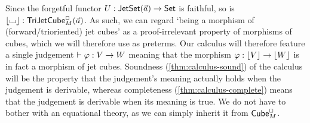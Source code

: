 \documentclass[a4paper]{article}
\begin{document}
Since the forgetful functor $U : \mathsf{JetSet}(\vec a) \to {\mathsf{Set}}$ is faithful, so is $\mathopen{}\left\lfloor {\llcorner\hspace{-.4ex}\lrcorner} \right\rfloor\mathclose{} : \mathsf{TriJetCube}^{\Box}_{M}\mathopen{}\left( \vec a \right)\mathclose{}$.
As such, we can regard `being a morphism of (forward/trioriented) jet cubes' as a proof-irrelevant property of morphisms of cubes, which we will therefore use as preterms.
Our calculus will therefore feature a single judgement $\vdash \varphi : V \to W$ meaning that the morphism $\varphi : \mathopen{}\left\lfloor V \right\rfloor\mathclose{} \to \mathopen{}\left\lfloor W \right\rfloor\mathclose{}$ is in fact a morphism of jet cubes.
Soundness (\cref{thm:calculus-sound}) of the calculus will be the property that the judgement's meaning actually holds when the judgement is derivable, whereas completeness (\cref{thm:calculus-complete}) means that the judgement is derivable when its meaning is true.
We do not have to bother with an equational theory, as we can simply inherit it from ${\mathsf{Cube}}_M^\Box$.
\end{document}
